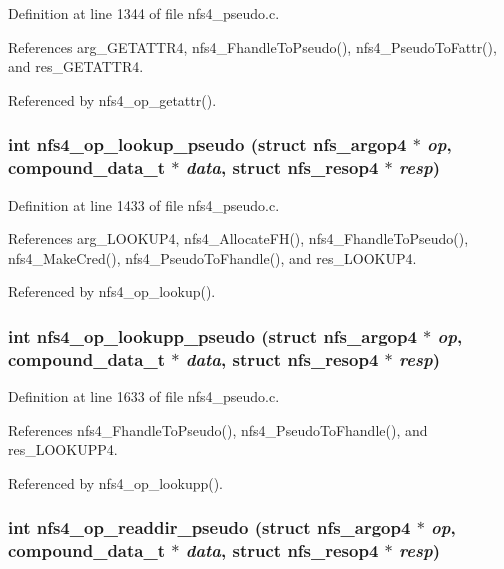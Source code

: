 Definition at line 1344 of file nfs4\_\-pseudo.c.

References arg\_\-GETATTR4, nfs4\_\-Fhandle\-To\-Pseudo(), nfs4\_\-Pseudo\-To\-Fattr(), and res\_\-GETATTR4.

Referenced by nfs4\_\-op\_\-getattr().
\subsubsection{\setlength{\rightskip}{0pt plus 5cm}int nfs4\_\-op\_\-lookup\_\-pseudo (struct nfs\_\-argop4 $\ast$ {\em op}, compound\_\-data\_\-t $\ast$ {\em data}, struct nfs\_\-resop4 $\ast$ {\em resp})}\label{nfs4__pseudo_8c_a24}




Definition at line 1433 of file nfs4\_\-pseudo.c.

References arg\_\-LOOKUP4, nfs4\_\-Allocate\-FH(), nfs4\_\-Fhandle\-To\-Pseudo(), nfs4\_\-Make\-Cred(), nfs4\_\-Pseudo\-To\-Fhandle(), and res\_\-LOOKUP4.

Referenced by nfs4\_\-op\_\-lookup().
\subsubsection{\setlength{\rightskip}{0pt plus 5cm}int nfs4\_\-op\_\-lookupp\_\-pseudo (struct nfs\_\-argop4 $\ast$ {\em op}, compound\_\-data\_\-t $\ast$ {\em data}, struct nfs\_\-resop4 $\ast$ {\em resp})}\label{nfs4__pseudo_8c_a25}




Definition at line 1633 of file nfs4\_\-pseudo.c.

References nfs4\_\-Fhandle\-To\-Pseudo(), nfs4\_\-Pseudo\-To\-Fhandle(), and res\_\-LOOKUPP4.

Referenced by nfs4\_\-op\_\-lookupp().
\subsubsection{\setlength{\rightskip}{0pt plus 5cm}int nfs4\_\-op\_\-readdir\_\-pseudo (struct nfs\_\-argop4 $\ast$ {\em op}, compound\_\-data\_\-t $\ast$ {\em data}, struct nfs\_\-resop4 $\ast$ {\em resp})}\label{nfs4__pseudo_8c_a26}




